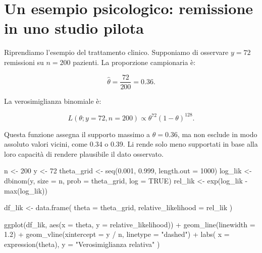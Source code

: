 \documentclass[
  italian,
  letterpaper,
  a4paper,
  11pt,
  open=any]{scrbook}
\newenvironment{Shaded}{\begin{snugshade}}{\end{snugshade}}
\newcommand{\AttributeTok}[1]{\textcolor[rgb]{0.40,0.45,0.13}{#1}}
\newcommand{\ConstantTok}[1]{\textcolor[rgb]{0.56,0.35,0.01}{#1}}
\newcommand{\DecValTok}[1]{\textcolor[rgb]{0.68,0.00,0.00}{#1}}
\newcommand{\FloatTok}[1]{\textcolor[rgb]{0.68,0.00,0.00}{#1}}
\newcommand{\FunctionTok}[1]{\textcolor[rgb]{0.28,0.35,0.67}{#1}}
\newcommand{\NormalTok}[1]{\textcolor[rgb]{0.00,0.23,0.31}{#1}}
\newcommand{\OtherTok}[1]{\textcolor[rgb]{0.00,0.23,0.31}{#1}}
\newcommand{\SpecialCharTok}[1]{\textcolor[rgb]{0.37,0.37,0.37}{#1}}
\newcommand{\StringTok}[1]{\textcolor[rgb]{0.13,0.47,0.30}{#1}}
\theoremstyle{plain}
\theoremstyle{definition}
\theoremstyle{definition}
\theoremstyle{remark}
\begin{document}
\section{Un esempio psicologico: remissione in uno studio
pilota}\label{sec-likelihood-remission-example}

Riprendiamo l'esempio del trattamento clinico. Supponiamo di osservare
\(y=72\) remissioni su \(n=200\) pazienti. La proporzione campionaria è:

\[
\hat{\theta} = \frac{72}{200} = 0.36.
\]

La verosimiglianza binomiale è:

\[
L(\theta; y=72,n=200) \propto \theta^{72}(1-\theta)^{128}.
\]

Questa funzione assegna il supporto massimo a \(\theta=0.36\), ma non
esclude in modo assoluto valori vicini, come 0.34 o 0.39. Li rende solo
meno supportati in base alla loro capacità di rendere plausibile il dato
osservato.

\begin{Shaded}
\begin{Highlighting}[]
\NormalTok{n }\OtherTok{\textless{}{-}} \DecValTok{200}
\NormalTok{y }\OtherTok{\textless{}{-}} \DecValTok{72}
\NormalTok{theta\_grid }\OtherTok{\textless{}{-}} \FunctionTok{seq}\NormalTok{(}\FloatTok{0.001}\NormalTok{, }\FloatTok{0.999}\NormalTok{, }\AttributeTok{length.out =} \DecValTok{1000}\NormalTok{)}
\NormalTok{log\_lik }\OtherTok{\textless{}{-}} \FunctionTok{dbinom}\NormalTok{(y, }\AttributeTok{size =}\NormalTok{ n, }\AttributeTok{prob =}\NormalTok{ theta\_grid, }\AttributeTok{log =} \ConstantTok{TRUE}\NormalTok{)}
\NormalTok{rel\_lik }\OtherTok{\textless{}{-}} \FunctionTok{exp}\NormalTok{(log\_lik }\SpecialCharTok{{-}} \FunctionTok{max}\NormalTok{(log\_lik))}

\NormalTok{df\_lik }\OtherTok{\textless{}{-}} \FunctionTok{data.frame}\NormalTok{(}
  \AttributeTok{theta =}\NormalTok{ theta\_grid,}
  \AttributeTok{relative\_likelihood =}\NormalTok{ rel\_lik}
\NormalTok{)}

\FunctionTok{ggplot}\NormalTok{(df\_lik, }\FunctionTok{aes}\NormalTok{(}\AttributeTok{x =}\NormalTok{ theta, }\AttributeTok{y =}\NormalTok{ relative\_likelihood)) }\SpecialCharTok{+}
  \FunctionTok{geom\_line}\NormalTok{(}\AttributeTok{linewidth =} \FloatTok{1.2}\NormalTok{) }\SpecialCharTok{+}
  \FunctionTok{geom\_vline}\NormalTok{(}\AttributeTok{xintercept =}\NormalTok{ y }\SpecialCharTok{/}\NormalTok{ n, }\AttributeTok{linetype =} \StringTok{"dashed"}\NormalTok{) }\SpecialCharTok{+}
  \FunctionTok{labs}\NormalTok{(}
    \AttributeTok{x =} \FunctionTok{expression}\NormalTok{(theta),}
    \AttributeTok{y =} \StringTok{"Verosimiglianza relativa"}
\NormalTok{  )}
\end{Highlighting}
\end{Shaded}
\end{document}
